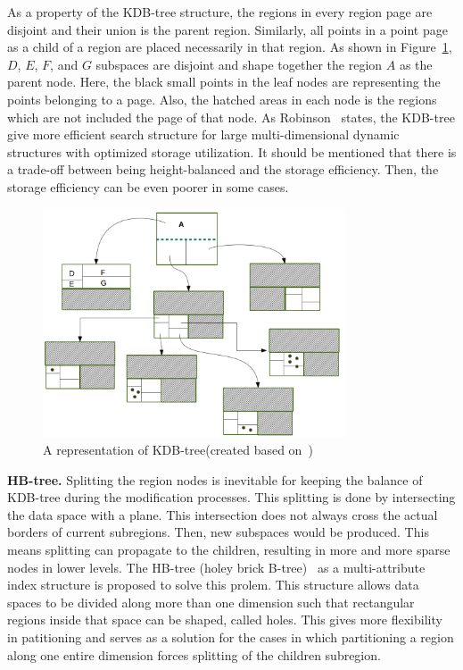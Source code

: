 \documentclass[a4paper,12pt]{article}
\begin{document}
As a property of the KDB-tree structure, the regions in every region page are disjoint and their union is the parent region. %
Similarly, all points in a point page as a child of a region are placed necessarily in that region.
As shown in Figure~\ref{figkdbtree}, $D$, $E$, $F$, and $G$ subspaces are disjoint and shape together the region $A$ as the parent node. Here, the black small points in the leaf nodes are representing the points belonging to a page. Also, the hatched areas in each node is the regions which are not included the page of that node. 
As Robinson~\cite{kdbtree} states, the KDB-tree give more efficient search structure for large multi-dimensional dynamic structures with optimized storage utilization. It should be mentioned that there is a trade-off between being height-balanced and the storage efficiency. Then, the storage efficiency can be even poorer in some cases.

\begin{figure}
\centering
\includegraphics[width=0.8\textwidth]{kdbtree}
\caption{A representation of KDB-tree(created based on~\cite{kdbtree})}
\label{figkdbtree}
\end{figure}

\textbf{HB-tree.} 
Splitting the region nodes is inevitable for keeping the balance of KDB-tree during the modification processes. This splitting is done by intersecting the data space with a plane. This intersection does not always cross the actual borders of current subregions. Then, new subspaces would be produced. This means splitting can propagate to the children, resulting in more and more sparse nodes in lower levels. The HB-tree (holey brick B-tree)~\cite{hbtree1} as a multi-attribute index structure is proposed to solve this prolem. This structure allows data spaces to be divided along more than one dimension such that rectangular regions inside that space can be shaped, called holes.
This gives more flexibility in patitioning and serves as a solution for the cases in which partitioning a region along one entire dimension forces splitting of the children subregion. 
\end{document}
